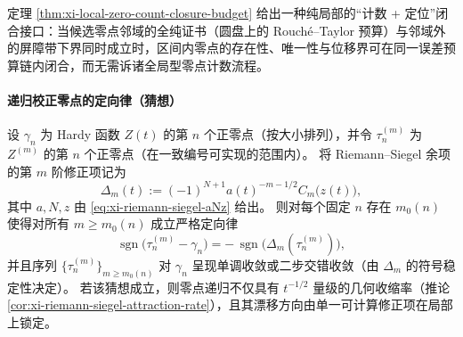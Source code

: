 \begin{remark}[计数闭合的制度含义]\label{rem:xi-local-zero-count-closure-meaning}
定理 \ref{thm:xi-local-zero-count-closure-budget} 给出一种纯局部的“计数 + 定位”闭合接口：当候选零点邻域的全纯证书（圆盘上的 Rouch\'e--Taylor 预算）与邻域外的屏障带下界同时成立时，区间内零点的存在性、唯一性与位移界可在同一误差预算链内闭合，而无需诉诸全局型零点计数流程。
\end{remark}

\paragraph{递归校正零点的定向律（猜想）}
\begin{conjecture}[首省略项锁定零点漂移方向]\label{conj:xi-riemann-siegel-omitted-term-direction-law}
设 \(\gamma_n\) 为 Hardy 函数 \(Z(t)\) 的第 \(n\) 个正零点（按大小排列），并令 \(\tau_n^{(m)}\) 为 \(Z^{(m)}\) 的第 \(n\) 个正零点（在一致编号可实现的范围内）。
将 Riemann--Siegel 余项的第 \(m\) 阶修正项记为
\[
\Delta_m(t):=(-1)^{N+1}a(t)^{-m-1/2}C_m\!\bigl(z(t)\bigr),
\]
其中 \(a,N,z\) 由 \eqref{eq:xi-riemann-siegel-aNz} 给出。
则对每个固定 \(n\) 存在 \(m_0(n)\) 使得对所有 \(m\ge m_0(n)\) 成立严格定向律
\[
\operatorname{sgn}\bigl(\tau_n^{(m)}-\gamma_n\bigr)
=
-\,\operatorname{sgn}\bigl(\Delta_m(\tau_n^{(m)})\bigr),
\]
并且序列 \(\{\tau_n^{(m)}\}_{m\ge m_0(n)}\) 对 \(\gamma_n\) 呈现单调收敛或二步交错收敛（由 \(\Delta_m\) 的符号稳定性决定）。
若该猜想成立，则零点递归不仅具有 \(t^{-1/2}\) 量级的几何收缩率（推论 \ref{cor:xi-riemann-siegel-attraction-rate}），且其漂移方向由单一可计算修正项在局部上锁定。
\end{conjecture}

\endinput
